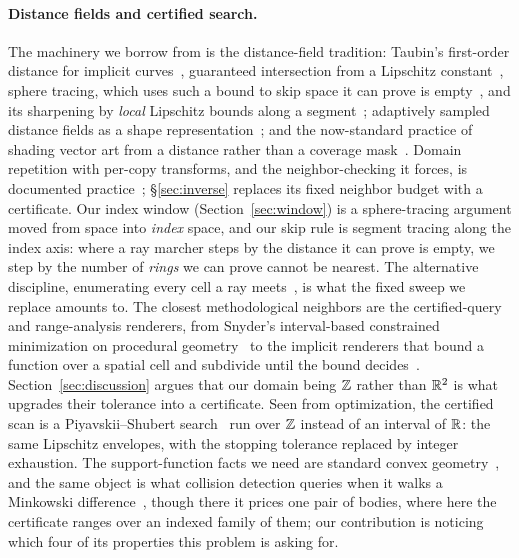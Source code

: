 \paragraph{Distance fields and certified search.}
The machinery we borrow from is the distance-field tradition: Taubin's
first-order distance for implicit curves~\cite{Taubin1994Distance}, guaranteed
intersection from a Lipschitz constant~\cite{Kalra1989}, sphere tracing, which uses
such a bound to skip space it can prove is empty~\cite{Hart1996Sphere}, and its
sharpening by \emph{local} Lipschitz bounds along a segment~\cite{Galin2020};
adaptively sampled distance fields as a shape
representation~\cite{Frisken2000Adaptively}; and the now-standard practice of
shading vector art from a distance rather than a coverage
mask~\cite{Green2007Improved, Quilez, Quilez2019Distance}. Domain repetition
with per-copy transforms, and the neighbor-checking it forces, is documented
practice~\cite{QuilezRepetition}; \S\ref{sec:inverse} replaces its fixed
neighbor budget with a certificate. Our index window
(Section~\ref{sec:window}) is a sphere-tracing argument moved from space into
\emph{index} space, and our skip rule is segment tracing along the index axis:
where a ray marcher steps by the distance it can prove is empty, we step by the
number of \emph{rings} we can prove cannot be nearest. The alternative discipline,
enumerating every cell a ray meets~\cite{Amanatides1987}, is what the fixed sweep
we replace amounts to. The closest methodological neighbors are the certified-query and
range-analysis renderers, from Snyder's interval-based constrained minimization
on procedural geometry~\cite{Snyder1992Interval} to the implicit renderers
that bound a function over a spatial cell and subdivide until the bound
decides~\cite{Knoll2009, Keeter2020, Sharp2022}. Section~\ref{sec:discussion}
argues that our domain being $\mathbb{Z}$ rather than $\mathbb{R}^2$ is what upgrades their
tolerance into a certificate. Seen from optimization, the certified scan is a Piyavskii--Shubert
search~\cite{Piyavskii1972, Shubert1972} run over $\mathbb{Z}$ instead of an interval of
$\mathbb{R}$: the same Lipschitz envelopes, with the stopping tolerance replaced by
integer exhaustion. The support-function facts we need are standard
convex geometry~\cite{Rockafellar1970Convex, Schneider2014Convex}, and the same
object is what collision detection queries when it walks a Minkowski
difference~\cite{GJK1988, Ericson2004}, though there it prices one pair of
bodies, where here the certificate ranges over an indexed family of them; our
contribution is noticing which four of its properties this problem is asking
for.


